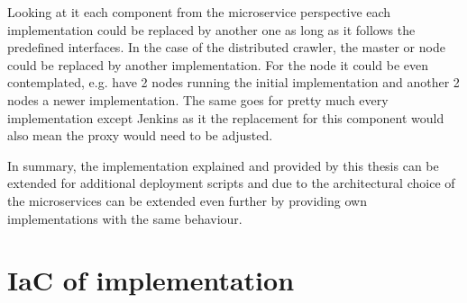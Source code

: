 Looking at it each component from the microservice perspective each implementation could be replaced by another one as long as it follows the predefined interfaces. In the case of the distributed crawler, the master or node could be replaced by another implementation. For the node it could be even contemplated, e.g. have 2 nodes running the initial implementation and another 2 nodes a newer implementation. The same goes for pretty much every implementation except Jenkins as it the replacement for this component would also mean the proxy would need to be adjusted.

In summary, the implementation explained and provided by this thesis can be extended for additional deployment scripts and due to the architectural choice of the microservices can be extended even further by providing own implementations with the same behaviour.

\section{IaC of implementation}



